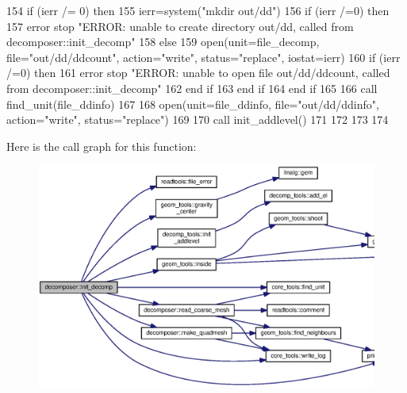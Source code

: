 \begin{DoxyCode}
154 \textcolor{comment}{      }\textcolor{keywordflow}{if} (ierr /= 0) \textcolor{keywordflow}{then}
155         ierr=system(\textcolor{stringliteral}{"mkdir out/dd"})
156         \textcolor{keywordflow}{if} (ierr /=0) \textcolor{keywordflow}{then}
157           error stop \textcolor{stringliteral}{"ERROR: unable to create directory out/dd, called from decomposer::init\_decomp"}
158         \textcolor{keywordflow}{else}
159           \textcolor{keyword}{open}(unit=file_decomp, file=\textcolor{stringliteral}{"out/dd/ddcount"}, action=\textcolor{stringliteral}{"write"}, status\textcolor{comment}{=}\textcolor{stringliteral}{"replace"}\textcolor{comment}{, iostat=ierr)}
160 \textcolor{comment}{          }\textcolor{keywordflow}{if} (ierr /=0) \textcolor{keywordflow}{then}
161             error stop \textcolor{stringliteral}{"ERROR: unable to open file out/dd/ddcount, called from decomposer::init\_decomp"}
162 \textcolor{keywordflow}{          end if}
163 \textcolor{keywordflow}{        end if}
164 \textcolor{keywordflow}{      end if}
165       
166       \textcolor{keyword}{call }find_unit(file_ddinfo)
167       
168       \textcolor{keyword}{open}(unit=file_ddinfo, file=\textcolor{stringliteral}{"out/dd/ddinfo"}, action=\textcolor{stringliteral}{"write"}, status\textcolor{comment}{=}\textcolor{stringliteral}{"replace"}\textcolor{comment}{)}
169 \textcolor{comment}{      }
170 \textcolor{comment}{      }\textcolor{keyword}{call }init_addlevel()
171       
172 
173         
174 
\end{DoxyCode}


Here is the call graph for this function\+:\nopagebreak
\begin{figure}[H]
\begin{center}
\leavevmode
\includegraphics[width=350pt]{namespacedecomposer_a98718ed1ed87442f86951d651992261d_cgraph}
\end{center}
\end{figure}




